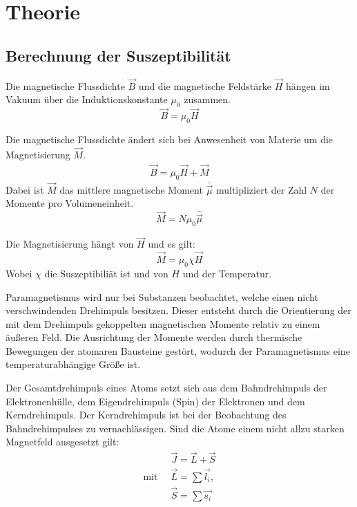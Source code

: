 \section{Theorie}
\label{sec:Theorie}

\cite{sample}
\subsection{Berechnung der Suszeptibilität}
Die magnetische Flussdichte $\vec{B}$ und die magnetische Feldstärke $\vec{H}$ hängen im Vakuum über die
Induktionskonstante $\mu_0$ zusammen.
\begin{equation}
  \vec{B} = \mu_0 \vec{H}
\end{equation}

Die magnetische Flussdichte ändert sich bei Anwesenheit von Materie um die Magnetisierung $\vec{M}$.
\begin{align}
  \vec{B} = \mu_0 \vec{H} + \vec{M}
\end{align}
Dabei ist $\vec{M}$ das mittlere magnetische Moment $\bar{\vec{\mu}}$ multipliziert der Zahl $N$ der Momente pro
Volumeneinheit.
\begin{equation}
  \vec{M} = N \mu_0 \bar{\vec{\mu}}
\end{equation}

Die Magnetisierung hängt von $\vec{H}$ und es gilt:
\begin{equation}
  \vec{M} = \mu_0 \chi \vec{H}
\end{equation}
Wobei $\chi$ die Suszeptibiliät ist und von $H$ und der Temperatur.

Paramagnetismus wird nur bei Substanzen beobachtet, welche einen nicht verschwindenden Drehimpuls besitzen.
Dieser entsteht durch die Orientierung der mit dem Drehimpuls gekoppelten magnetischen
Momente relativ zu einem äußeren Feld. Die Ausrichtung der Momente werden durch thermische Bewegungen
der atomaren Bausteine gestört, wodurch der Paramagnetismus eine temperaturabhängige Größe ist.

Der Gesamtdrehimpuls eines Atoms setzt sich aus dem
Bahndrehimpuls der Elektronenhülle, dem Eigendrehimpuls (Spin) der Elektronen und
dem Kerndrehimpuls. Der Kerndrehimpuls ist bei der Beobachtung des Bahndrehimpulses zu
vernachlässigen. Sind die Atome einem nicht allzu starken Magnetfeld ausgesetzt gilt:
\begin{align*}
  &\vec{J} = \vec{L} + \vec{S} \\
  \text{mit} \;\; &\vec{L} = \sum \vec{l_i}, \\
  &\vec{S} = \sum \vec{s_i}
\end{align*}

